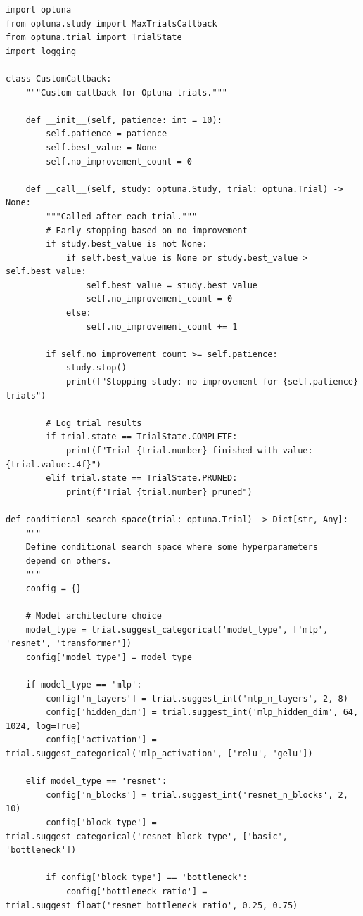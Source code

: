 \begin{lstlisting}[style=python, caption=Optuna with conditional search spaces and callbacks]
import optuna
from optuna.study import MaxTrialsCallback
from optuna.trial import TrialState
import logging

class CustomCallback:
    """Custom callback for Optuna trials."""

    def __init__(self, patience: int = 10):
        self.patience = patience
        self.best_value = None
        self.no_improvement_count = 0

    def __call__(self, study: optuna.Study, trial: optuna.Trial) -> None:
        """Called after each trial."""
        # Early stopping based on no improvement
        if study.best_value is not None:
            if self.best_value is None or study.best_value > self.best_value:
                self.best_value = study.best_value
                self.no_improvement_count = 0
            else:
                self.no_improvement_count += 1

        if self.no_improvement_count >= self.patience:
            study.stop()
            print(f"Stopping study: no improvement for {self.patience} trials")

        # Log trial results
        if trial.state == TrialState.COMPLETE:
            print(f"Trial {trial.number} finished with value: {trial.value:.4f}")
        elif trial.state == TrialState.PRUNED:
            print(f"Trial {trial.number} pruned")

def conditional_search_space(trial: optuna.Trial) -> Dict[str, Any]:
    """
    Define conditional search space where some hyperparameters
    depend on others.
    """
    config = {}

    # Model architecture choice
    model_type = trial.suggest_categorical('model_type', ['mlp', 'resnet', 'transformer'])
    config['model_type'] = model_type

    if model_type == 'mlp':
        config['n_layers'] = trial.suggest_int('mlp_n_layers', 2, 8)
        config['hidden_dim'] = trial.suggest_int('mlp_hidden_dim', 64, 1024, log=True)
        config['activation'] = trial.suggest_categorical('mlp_activation', ['relu', 'gelu'])

    elif model_type == 'resnet':
        config['n_blocks'] = trial.suggest_int('resnet_n_blocks', 2, 10)
        config['block_type'] = trial.suggest_categorical('resnet_block_type', ['basic', 'bottleneck'])

        if config['block_type'] == 'bottleneck':
            config['bottleneck_ratio'] = trial.suggest_float('resnet_bottleneck_ratio', 0.25, 0.75)


\end{lstlisting}
